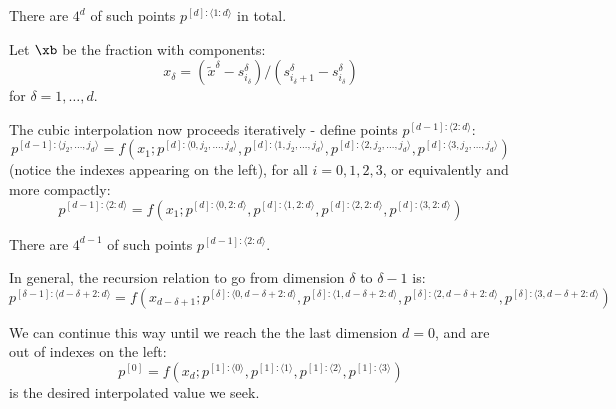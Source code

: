 \documentclass[11pt]{article}
\begin{document}
There are $4^d$ of such points $p^{[d]: \langle 1:d \rangle}$ in total.

Let $\xb$ be the fraction with components:
\begin{equation}
x_\delta = (\tilde{x}^\delta - s_{i_\delta}^\delta) / (s_{i_\delta+1}^\delta - s_{i_\delta}^\delta)
\end{equation}
for $\delta=1,\dots,d$.

The cubic interpolation now proceeds iteratively - define points $p^{[d-1]: \langle 2: d \rangle}$:
\begin{equation}
p^{[d-1]: \langle j_2,\dots,j_d \rangle} = f \left ( 
x_1 ; 
p^{[d]: \langle 0,j_2,\dots,j_d \rangle},
p^{[d]: \langle 1,j_2,\dots,j_d \rangle},
p^{[d]: \langle 2,j_2,\dots,j_d \rangle},
p^{[d]: \langle 3,j_2,\dots,j_d \rangle}
\right )
\end{equation}
(notice the indexes appearing on the left), for all $i=0,1,2,3$, or equivalently and more compactly:
\begin{equation}
p^{[d-1]: \langle 2:d \rangle} = f \left ( 
x_1 ; 
p^{[d]: \langle 0,2:d \rangle},
p^{[d]: \langle 1,2:d \rangle},
p^{[d]: \langle 2,2:d \rangle},
p^{[d]: \langle 3,2:d \rangle}
\right )
\label{eq:iterate1}
\end{equation}

There are $4^{d-1}$ of such points $p^{[d-1]:\langle 2:d \rangle}$.

In general, the recursion relation to go from dimension $\delta$ to $\delta-1$ is:
\begin{equation}
p^{[\delta-1]: \langle d-\delta+2:d \rangle} = f \left ( 
x_{d-\delta+1} ; 
p^{[\delta]: \langle 0,d-\delta+2:d \rangle},
p^{[\delta]: \langle 1,d-\delta+2:d \rangle},
p^{[\delta]: \langle 2,d-\delta+2:d \rangle},
p^{[\delta]: \langle 3,d-\delta+2:d \rangle}
\right )
\label{eq:rec}
\end{equation}

We can continue this way until we reach the the last dimension $d=0$, and are out of indexes on the left:
\begin{equation}
p^{[0]} = f \left ( 
x_d ; 
p^{[1]: \langle 0 \rangle},
p^{[1]: \langle 1 \rangle},
p^{[1]: \langle 2 \rangle},
p^{[1]: \langle 3 \rangle}
\right )
\label{eq:soln}
\end{equation}
is the desired interpolated value we seek.
\end{document}
